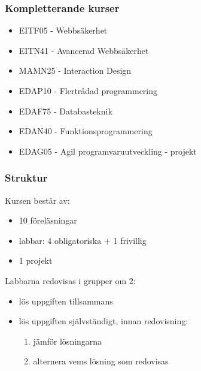 \documentclass[aspectratio=1610]{beamer}
\begin{document}
\begin{frame}
  \frametitle{Kompletterande kurser}
\begin{itemize}
\item EITF05 - Webbsäkerhet
\item EITN41 - Avancerad Webbsäkerhet
\item MAMN25 - Interaction Design
\item EDAP10  - Flertrådad programmering
\item EDAF75 - Databasteknik
\item EDAN40 - Funktionsprogrammering
\item EDAG05 - Agil programvaruutveckling - projekt
\end{itemize}

\end{frame}

\begin{frame}
  \frametitle{Struktur}
Kursen består av:
\begin{itemize}
  \item 10 föreläsningar
  \item labbar: 4 obligatoriska + 1 frivillig
  \item 1 projekt
\end{itemize}
\vspace{2mm}
Labbarna redovisas i grupper om 2:
\begin{itemize}
 \item lös uppgiften tillsammans
 \item lös uppgiften självständigt, innan redovisning:
   \begin{enumerate}
     \item jämför lösningarna
     \item alternera vems lösning som redovisas
   \end{enumerate}
\end{itemize}
\end{frame}
\end{document}
